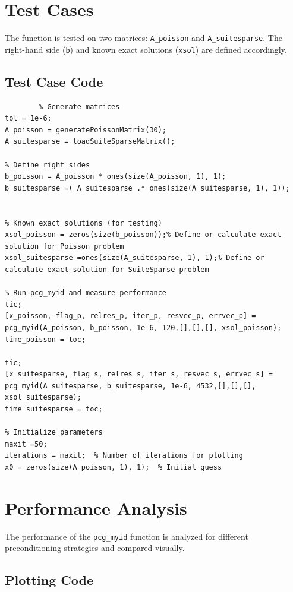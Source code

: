 \section*{Test Cases}

The function is tested on two matrices: \texttt{A\_poisson} and \texttt{A\_suitesparse}. The right-hand side (\texttt{b}) and known exact solutions (\texttt{xsol}) are defined accordingly.

\subsection*{Test Case Code}

\begin{center}
    \begin{lstlisting}
        % Generate matrices
tol = 1e-6;
A_poisson = generatePoissonMatrix(30);
A_suitesparse = loadSuiteSparseMatrix();

% Define right sides
b_poisson = A_poisson * ones(size(A_poisson, 1), 1);
b_suitesparse =( A_suitesparse .* ones(size(A_suitesparse, 1), 1));


% Known exact solutions (for testing)
xsol_poisson = zeros(size(b_poisson));% Define or calculate exact solution for Poisson problem
xsol_suitesparse =ones(size(A_suitesparse, 1), 1);% Define or calculate exact solution for SuiteSparse problem

% Run pcg_myid and measure performance
tic;
[x_poisson, flag_p, relres_p, iter_p, resvec_p, errvec_p] = pcg_myid(A_poisson, b_poisson, 1e-6, 120,[],[],[], xsol_poisson);
time_poisson = toc;

tic;
[x_suitesparse, flag_s, relres_s, iter_s, resvec_s, errvec_s] = pcg_myid(A_suitesparse, b_suitesparse, 1e-6, 4532,[],[],[], xsol_suitesparse);
time_suitesparse = toc;

% Initialize parameters
maxit =50;
iterations = maxit;  % Number of iterations for plotting
x0 = zeros(size(A_poisson, 1), 1);  % Initial guess
    \end{lstlisting}
\end{center}

\section*{Performance Analysis}

The performance of the \texttt{pcg\_myid} function is analyzed for different preconditioning strategies and compared visually.

\subsection*{Plotting Code}

